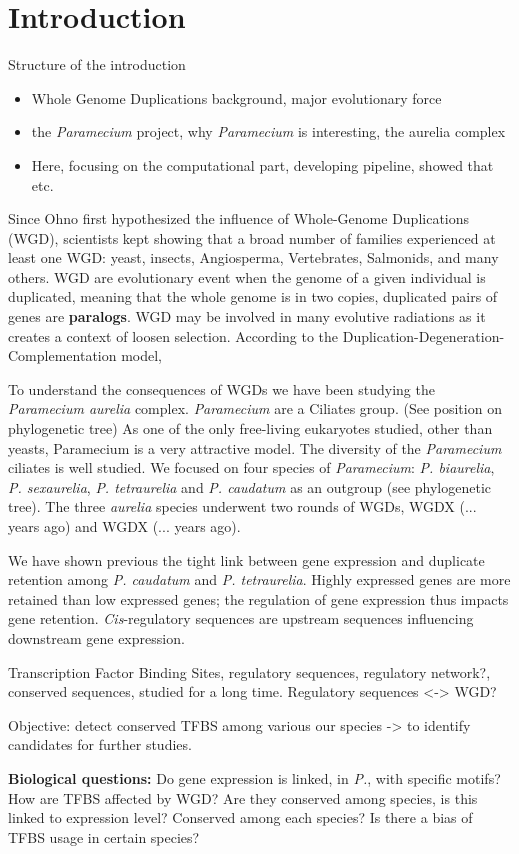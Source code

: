 \section*{Introduction}

Structure of the introduction
\newline
\begin{itemize}
\item Whole Genome Duplications background, major evolutionary force
\item the \textit{Paramecium} project, why \textit{Paramecium} is interesting, the aurelia complex
\item Here, focusing on the computational part, developing pipeline, showed that etc.
\end{itemize}

Since Ohno first hypothesized the influence of Whole-Genome Duplications (WGD), scientists kept showing that a broad number of families experienced at least one WGD: yeast, insects, Angiosperma, Vertebrates, Salmonids, and many others. WGD are evolutionary event when the genome of a given individual is duplicated, meaning that the whole genome is in two copies, duplicated pairs of genes are \textbf{paralogs}. WGD may be involved in many evolutive radiations as it creates a context of loosen selection. According to the Duplication-Degeneration-Complementation model,

To understand the consequences of WGDs we have been studying the \textit{Paramecium aurelia} complex. \textit{Paramecium} are a Ciliates group. (See position on phylogenetic tree) As one of the only free-living eukaryotes studied, other than yeasts, Paramecium is a very attractive model. The diversity of the \textit{Paramecium} ciliates is well studied. We focused on four species of \textit{Paramecium}: \textit{P. biaurelia}, \textit{P. sexaurelia}, \textit{P. tetraurelia} and \textit{P. caudatum} as an outgroup (see phylogenetic tree). The three \textit{aurelia} species underwent two rounds of WGDs, WGDX (... years ago) and WGDX (... years ago).

We have shown previous the tight link between gene expression and duplicate retention among \textit{P. caudatum} and \textit{P. tetraurelia}. Highly expressed genes are more retained than low expressed genes; the regulation of gene expression thus impacts gene retention. \textit{Cis}-regulatory sequences are upstream sequences influencing downstream gene expression.

Transcription Factor Binding Sites, regulatory sequences, regulatory network?, conserved sequences, studied for a long time. Regulatory sequences <-> WGD?

Objective: detect conserved TFBS among various our species -> to identify candidates for further studies.

\textbf{Biological questions:} Do gene expression is linked, in \textit{P.}, with specific motifs? How are TFBS affected by WGD? Are they conserved among species, is this linked to expression level? Conserved among each species? Is there a bias of TFBS usage in certain species?